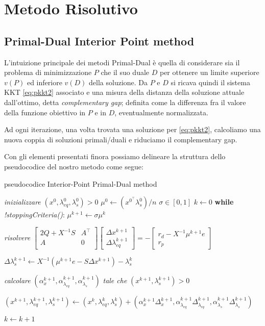 \section{Metodo Risolutivo}
\subsection{Primal-Dual Interior Point method}
L'intuizione principale dei metodi Primal-Dual è 
quella di considerare sia il problema di minimizzazione
 $P$ che il suo duale $D$ per ottenere un limite 
superiore $v(P)$ ed inferiore $v(D)$ della soluzione.
Da $P$ e $D$ si ricava quindi il sistema KKT \ref{eq:pkkt2} associato e una misura
 della distanza della soluzione attuale dall'ottimo, detta \textit{complementary gap};
  definita come la differenza fra il valore della funzione obiettivo in $P$ e in $D$, eventualmente normalizzata.
  
  Ad ogni iterazione, una volta trovata una soluzione per \ref{eq:pkkt2}, calcoliamo una nuova coppia di soluzioni primali/duali 
  e riduciamo il complementary gap.

  Con gli elementi presentati finora possiamo delineare la struttura dello pseudocodice del nostro metodo come segue:

\begin{algorithm}
\caption{pseudocodice Interior-Point Primal-Dual method}\label{alg:pseudo}
\begin{algorithmic}[1]
\State \textit{inizializzare} $(x^0, \lambda_{eq}^0, \lambda_s^0) > 0$ 
\State $\mu^0 \gets (x^0^\intercal \lambda_s^0)/n$
\State $\sigma \in [0,1]$
\State $k \gets 0$
\BState \textbf{while} \emph{!stoppingCriteria()}:
\State $\mu^{k+1} \gets \sigma \mu^{k}  $

\State \textit{risolvere} \;$
\begin{bmatrix}
2Q +X^{-1}S & A^\intercal\\
A & 0 \\
\end{bmatrix}\begin{bmatrix}\Delta x^{k+1} \\ \Delta \lambda_{eq}^{k+1}\end{bmatrix}= -
\begin{bmatrix}
    r_d-X^{-1}\mu^{k+1} e\\r_p
\end{bmatrix}
$

\State $\Delta \lambda_s^{k+1} \gets X^{-1}(\mu^{k+1} e - S\Delta x^{k+1}) - \lambda_s^{k}$ 

\State \textit{calcolare} \; $(\alpha_x^{k+1}, \alpha_{\lambda_{eq}}^{k+1}, \alpha_{\lambda_{s}}^{k+1})$ 
\textit{tale che} $(x^{k+1},\lambda_{s}^{k+1})>0$


\State $(x^{k+1}, \lambda_{eq}^{k+1}, \lambda_{s}^{k+1}) \gets
(x^{k}, \lambda_{eq}^{k}, \lambda_{s}^{k}) + 
(\alpha_x^{k+1}\Delta_x^{k+1}, \alpha_{\lambda_{eq}}^{k+1}\Delta_{\lambda_{eq}}^{k+1}, \alpha_{\lambda_{s}}^{k+1}\Delta_{\lambda_{s}}^{k+1})$

\State $k \gets k + 1$
\EndFunction
\end{algorithmic}
\end{algorithm}


